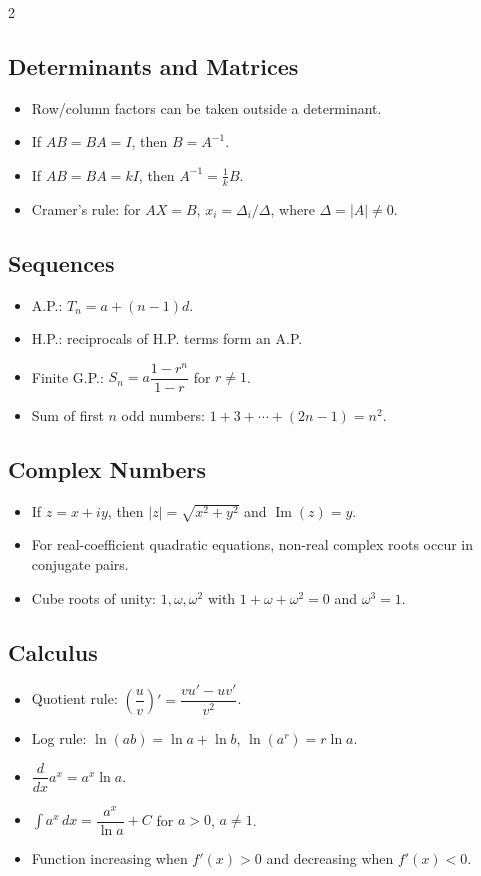 \documentclass[11pt,a4paper]{article}
\begin{document}
\begin{multicols}{2}
\subsection*{Determinants and Matrices}
\begin{itemize}[leftmargin=*]
\item Row/column factors can be taken outside a determinant.
\item If $AB=BA=I$, then $B=A^{-1}$.
\item If $AB=BA=kI$, then $A^{-1}=\frac1kB$.
\item Cramer's rule: for $AX=B$, $x_i=\Delta_i/\Delta$, where $\Delta=|A|\ne0$.
\end{itemize}

\subsection*{Sequences}
\begin{itemize}[leftmargin=*]
\item A.P.: $T_n=a+(n-1)d$.
\item H.P.: reciprocals of H.P. terms form an A.P.
\item Finite G.P.: $S_n=a\dfrac{1-r^n}{1-r}$ for $r\ne1$.
\item Sum of first $n$ odd numbers: $1+3+\cdots+(2n-1)=n^2$.
\end{itemize}

\subsection*{Complex Numbers}
\begin{itemize}[leftmargin=*]
\item If $z=x+iy$, then $|z|=\sqrt{x^2+y^2}$ and $\operatorname{Im}(z)=y$.
\item For real-coefficient quadratic equations, non-real complex roots occur in conjugate pairs.
\item Cube roots of unity: $1,\omega,\omega^2$ with $1+\omega+\omega^2=0$ and $\omega^3=1$.
\end{itemize}

\subsection*{Calculus}
\begin{itemize}[leftmargin=*]
\item Quotient rule: $\left(\dfrac uv\right)'=\dfrac{vu'-uv'}{v^2}$.
\item Log rule: $\ln(ab)=\ln a+\ln b$, $\ln(a^r)=r\ln a$.
\item $\dfrac{d}{dx}a^x=a^x\ln a$.
\item $\int a^x\,dx=\dfrac{a^x}{\ln a}+C$ for $a>0$, $a\ne1$.
\item Function increasing when $f'(x)>0$ and decreasing when $f'(x)<0$.
\end{itemize}


\end{multicols}
\end{document}
